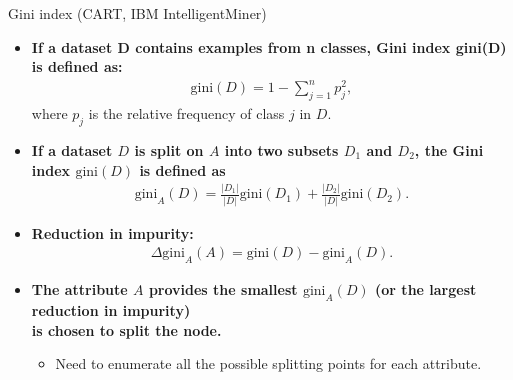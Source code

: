 \documentclass[aspectratio=169,t,table]{beamer}
\begin{document}
  {
    \begin{frame}{Gini index (CART, IBM IntelligentMiner)}
      \begin{itemize}
        \item \textbf{If a dataset D contains examples from n classes, Gini index gini(D) is defined as:}
        \begin{align}
          \text{gini}(D) = 1-\sum_{j=1}^{n} p_j^2,
        \end{align}
        where $p_j$ is the relative frequency of class $j$ in $D$.
        \item \textbf{If a dataset $D$ is split on $A$ into two subsets $D_1$ and $D_2$, the Gini index $\text{gini}(D)$ is defined as}
        \begin{align}
          \text{gini}_A(D) = \frac{|D_1|}{|D|}\text{gini}(D_1)+\frac{|D_2|}{|D|}\text{gini}(D_2).
        \end{align}
        \item \textbf{Reduction in impurity:}
        \begin{align}
          \Delta \text{gini}_A(A) = \text{gini}(D)-\text{gini}_A(D).
        \end{align}
        \item \textbf{The attribute $A$ provides the smallest $\text{gini}_A(D)$ (or the largest reduction in impurity) \\ is chosen to split the node.}
        \begin{itemize}
          \item Need to enumerate all the possible splitting points for each attribute.
        \end{itemize}
      \end{itemize}
    \end{frame}
  }
\end{document}
